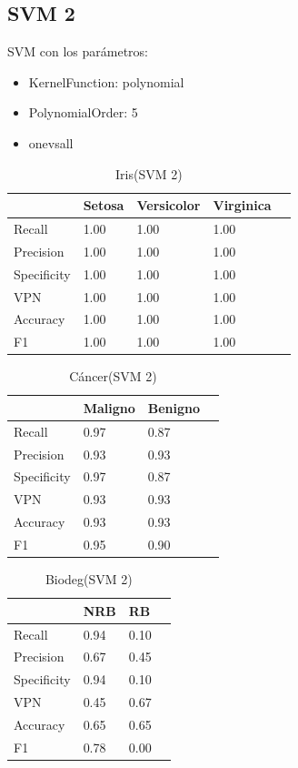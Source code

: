 \documentclass[a4paper,openwrite,12pt]{article}
\begin{document}
\subsection{SVM 2}
SVM con los parámetros:
\begin{itemize}
    \item KernelFunction: polynomial
    \item PolynomialOrder: 5
    \item onevsall
\end{itemize}

\begin{table}[H]
\centering
\begin{tabular}{@{}lllll@{}}
\toprule
            & Setosa & Versicolor & Virginica &  \\ \midrule
Recall      & 1.00   & 1.00       & 1.00      &  \\
Precision   & 1.00   & 1.00       & 1.00      &  \\
Specificity & 1.00   & 1.00       & 1.00      &  \\
VPN         & 1.00   & 1.00       & 1.00      &  \\
Accuracy    & 1.00   & 1.00       & 1.00      &  \\
F1          & 1.00   & 1.00       & 1.00      &  \\ \bottomrule
\end{tabular}
\caption{Iris(SVM 2)}
\end{table}


\begin{table}[H]
\centering
\begin{tabular}{@{}llll@{}}
\toprule
            & Maligno & Benigno &  \\ \midrule
Recall      & 0.97    & 0.87    &  \\
Precision   & 0.93    & 0.93    &  \\
Specificity & 0.97    & 0.87    &  \\
VPN         & 0.93    & 0.93    &  \\
Accuracy    & 0.93    & 0.93    &  \\
F1          & 0.95    & 0.90    &  \\ \bottomrule
\end{tabular}
\caption{Cáncer(SVM 2)}
\end{table}


\begin{table}[H]
\centering
\begin{tabular}{@{}llll@{}}
\toprule
            & NRB &   RB &  \\ \midrule
Recall      & 0.94    & 0.10    &  \\
Precision   & 0.67    & 0.45    &  \\
Specificity & 0.94    & 0.10    &  \\
VPN         & 0.45    & 0.67    &  \\
Accuracy    & 0.65    & 0.65    &  \\
F1          & 0.78    & 0.00    &  \\ \bottomrule
\end{tabular}
\caption{Biodeg(SVM 2)}
\end{table}
\end{document}
